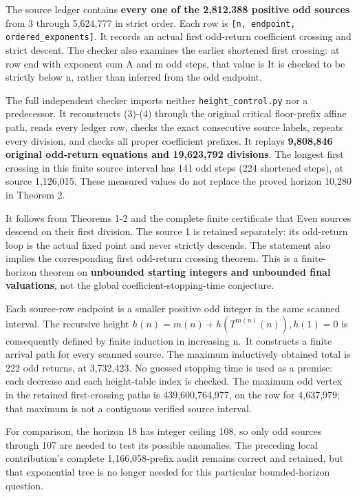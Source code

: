 The source ledger contains \textbf{every one of the 2,812,388 positive
odd sources} from 3 through 5,624,777 in strict order. Each row is
\nolinkurl{[n, endpoint, ordered_exponents]}. It records an actual first
odd-return coefficient crossing and strict descent. The checker also
examines the earlier shortened first crossing: at row end with exponent
sum A and m odd steps, that value is
 It is checked to
be strictly below n, rather than inferred from the odd endpoint.

The full independent checker imports neither
\nolinkurl{height_control.py} nor a predecessor. It reconstructs (3)-(4)
through the original critical floor-prefix affine path, reads every
ledger row, checks the exact consecutive source labels, repeats every
division, and checks all proper coefficient prefixes. It replays
\textbf{9,808,846 original odd-return equations and 19,623,792
divisions}. The longest first crossing in this finite source interval
has 141 odd steps (224 shortened steps), at source 1,126,015. These
measured values do not replace the proved horizon 10,280 in Theorem 2.

It follows from Theorems 1-2 and the complete finite certificate that
Even sources descend on their first division. The source 1 is retained
separately: its odd-return loop is the actual fixed point and never
strictly descends. The statement also implies the corresponding first
odd-return crossing theorem. This is a finite-horizon theorem on
\textbf{unbounded starting integers and unbounded final valuations}, not
the global coefficient-stopping-time conjecture.

Each source-row endpoint is a smaller positive odd integer in the same
scanned interval. The recursive height
\(h(n)=m(n)+h(T^{m(n)}(n)),h(1)=0\) is consequently defined by finite
induction in increasing n.~It constructs a finite arrival path for every
scanned source. The maximum inductively obtained total is 222 odd
returns, at 3,732,423. No guessed stopping time is used as a premise:
each decrease and each height-table index is checked. The maximum odd
vertex in the retained first-crossing paths is 439,600,764,977, on the
row for 4,637,979; that maximum is not a contiguous verified source
interval.

For comparison, the horizon 18 has integer ceiling 108, so only odd
sources through 107 are needed to test its possible anomalies. The
preceding local contribution's complete 1,166,058-prefix audit remains
correct and retained, but that exponential tree is no longer needed for
this particular bounded-horizon question.

